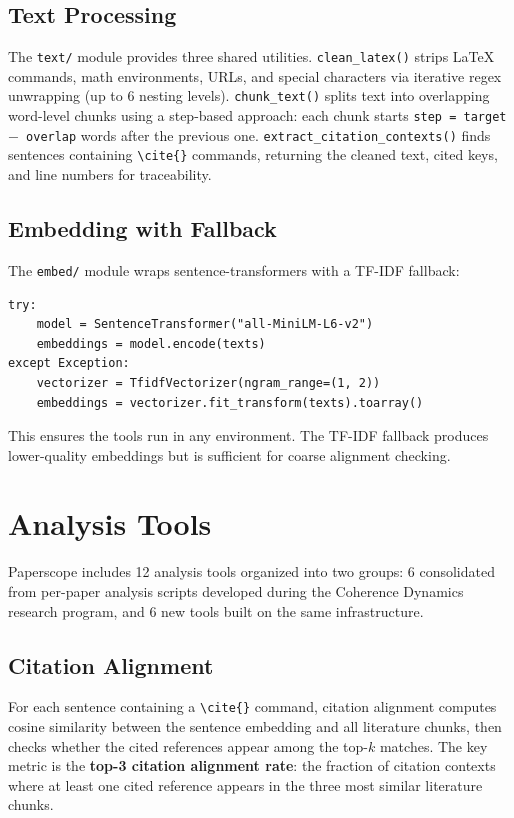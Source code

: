 \documentclass[11pt,a4paper]{article}
\begin{document}
\subsection{Text Processing}

The \texttt{text/} module provides three shared utilities. \texttt{clean\_latex()} strips LaTeX commands, math environments, URLs, and special characters via iterative regex unwrapping (up to 6 nesting levels). \texttt{chunk\_text()} splits text into overlapping word-level chunks using a step-based approach: each chunk starts \texttt{step = target $-$ overlap} words after the previous one. \texttt{extract\_citation\_contexts()} finds sentences containing \texttt{\textbackslash cite\{\}} commands, returning the cleaned text, cited keys, and line numbers for traceability.

\subsection{Embedding with Fallback}

The \texttt{embed/} module wraps sentence-transformers with a TF-IDF fallback:

\begin{verbatim}
try:
    model = SentenceTransformer("all-MiniLM-L6-v2")
    embeddings = model.encode(texts)
except Exception:
    vectorizer = TfidfVectorizer(ngram_range=(1, 2))
    embeddings = vectorizer.fit_transform(texts).toarray()
\end{verbatim}

This ensures the tools run in any environment. The TF-IDF fallback produces lower-quality embeddings but is sufficient for coarse alignment checking.

\section{Analysis Tools}

Paperscope includes 12 analysis tools organized into two groups: 6 consolidated from per-paper analysis scripts developed during the Coherence Dynamics research program, and 6 new tools built on the same infrastructure.

\subsection{Citation Alignment}

For each sentence containing a \texttt{\textbackslash cite\{\}} command, citation alignment computes cosine similarity between the sentence embedding and all literature chunks, then checks whether the cited references appear among the top-$k$ matches. The key metric is the \textbf{top-3 citation alignment rate}: the fraction of citation contexts where at least one cited reference appears in the three most similar literature chunks.
\end{document}

